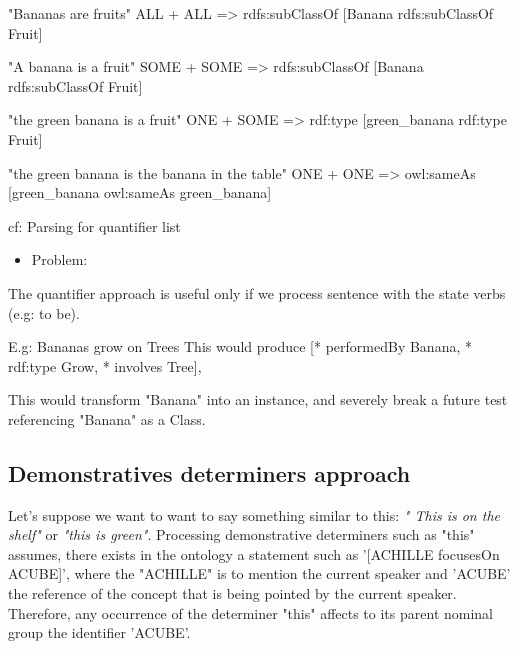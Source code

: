 \documentclass[twoside,a4paper,10pt]{report}
\begin{document}
\small
\begin{verbatimtab}
  
  "Bananas         are             fruits"
    ALL             +               ALL                   => rdfs:subClassOf
  [Banana     rdfs:subClassOf      Fruit]
  
  "A banana        is               a fruit"
    SOME           +                 SOME                 => rdfs:subClassOf
  [Banana     rdfs:subClassOf       Fruit]
  
  "the green banana    is           a fruit"
     ONE               +             SOME                 => rdf:type
  [green_banana    rdf:type         Fruit]
  
  "the green banana     is       the banana in the table"
      ONE               +                ONE              => owl:sameAs
  [green_banana    owl:sameAs       green_banana]
  
  cf: Parsing for quantifier list
  
\end{verbatimtab}
\normalsize

\begin{itemize}
    \item  Problem:
\end{itemize}

The quantifier approach is useful only if we process sentence with the state verbs (e.g: to be).


\small
\begin{verbatimtab}
  
  E.g: Bananas grow on Trees
  This would produce 
  [* performedBy Banana, 
   * rdf:type Grow,
   * involves Tree], 
  
  This would transform "Banana" into an instance, and severely break a future test referencing
"Banana" as a Class.
  
\end{verbatimtab}
\normalsize

\subsection{Demonstratives determiners approach}
\label{b4ad6f4ec31665f1d879aeafb5ba415e}%
Let's suppose we want to want to say something similar to this: \textsl{" This is on the shelf"} or \textsl{"this is green"}.
Processing demonstrative determiners such as "this" assumes, there exists in the ontology a statement such as '[ACHILLE focusesOn A{\textunderscore}CUBE]’, where the "ACHILLE"
is to mention the current speaker and 'A{\textunderscore}CUBE' the reference of the concept that is being pointed by the current speaker.
Therefore, any occurrence of the determiner "this" affects to its parent nominal group the identifier 'A{\textunderscore}CUBE'.
\end{document}
